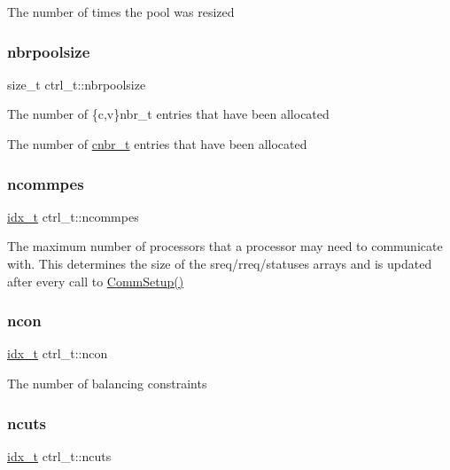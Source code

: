 The number of times the pool was resized \mbox{\label{a00742_ae37af5d894dbeea35f735361503e58a9}} 
\subsubsection{\texorpdfstring{nbrpoolsize}{nbrpoolsize}}
{\footnotesize\ttfamily size\+\_\+t ctrl\+\_\+t\+::nbrpoolsize}

The number of \{c,v\}nbr\+\_\+t entries that have been allocated

The number of \hyperlink{a00714}{cnbr\+\_\+t} entries that have been allocated \mbox{\label{a00742_a120ba1a44430e6e9655edaebed67f249}} 
\subsubsection{\texorpdfstring{ncommpes}{ncommpes}}
{\footnotesize\ttfamily \hyperlink{a00876_aaa5262be3e700770163401acb0150f52}{idx\+\_\+t} ctrl\+\_\+t\+::ncommpes}

The maximum number of processors that a processor may need to communicate with. This determines the size of the sreq/rreq/statuses arrays and is updated after every call to \hyperlink{a00960_a8247e54e9e936d99c991d14d3f5ba03a}{Comm\+Setup()} \mbox{\label{a00742_afb1fd1cb311eb4bcefa46a14ef05afa0}} 
\subsubsection{\texorpdfstring{ncon}{ncon}}
{\footnotesize\ttfamily \hyperlink{a00876_aaa5262be3e700770163401acb0150f52}{idx\+\_\+t} ctrl\+\_\+t\+::ncon}

The number of balancing constraints \mbox{\label{a00742_a40c46fa39e062a9efdc6eaacefe44a8b}} 
\subsubsection{\texorpdfstring{ncuts}{ncuts}}
{\footnotesize\ttfamily \hyperlink{a00876_aaa5262be3e700770163401acb0150f52}{idx\+\_\+t} ctrl\+\_\+t\+::ncuts}

